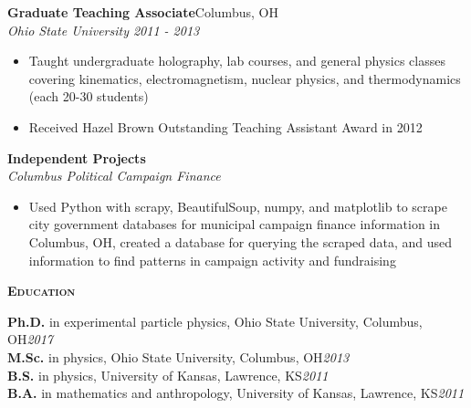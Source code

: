 \documentclass[line]{letter}
\begin{document}
\begin{addmargin}[1em]{1em}
{\large {\bf Graduate Teaching Associate}\hfill Columbus, OH\vspace{1mm}}\\
{\large \it Ohio State University \hfill 2011 - 2013} \\
\vspace{-7mm}
\begin{itemize}[leftmargin=5mm]
\item Taught undergraduate holography, lab courses, and general physics classes covering kinematics, electromagnetism, nuclear physics, and thermodynamics (each 20-30 students)
\item Received Hazel Brown Outstanding Teaching Assistant Award in 2012
\end{itemize}

{\large {\bf Independent Projects}\vspace{1mm}}\\
{\large \it Columbus Political Campaign Finance} \\
\vspace{-7mm}
\begin{itemize}[leftmargin=5mm]
\item Used Python with scrapy, BeautifulSoup, numpy, and matplotlib to scrape city government databases for municipal campaign finance information in Columbus, OH, created a database for querying the scraped data, and used information to find patterns in campaign activity and fundraising 
\end{itemize}
\end{addmargin}


{\vspace{10pt}\Large \textsc{\textbf{Education}}}%
\begin{addmargin}[1em]{1em}
{\bf \large Ph.D.} in experimental particle physics, Ohio State University, Columbus, OH\hfill {\large \it 2017}\vspace{1mm}\\
{\bf \large M.Sc.} in physics, Ohio State University, Columbus, OH\hfill {\large \it 2013}\vspace{1mm}\\
{\bf \large B.S.} in physics, University of Kansas, Lawrence, KS\hfill {\large \it 2011}\vspace{1mm}\\
{\bf \large B.A.} in mathematics and anthropology,  University of Kansas, Lawrence, KS\hfill {\large \it 2011}
\end{addmargin}
\end{document}
